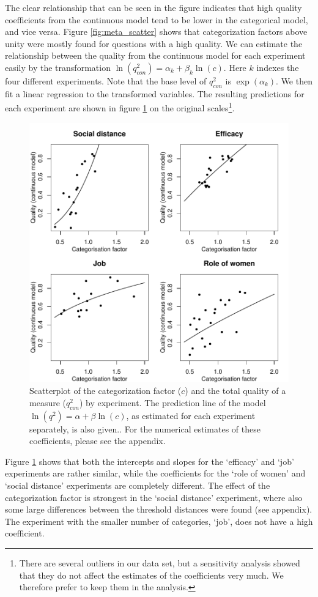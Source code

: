 \documentclass[a4paper,12pt]{article}
\begin{document}
The clear relationship that can be seen in the figure indicates that high quality coefficients from the continuous model tend to be lower in the categorical model, and vice versa. Figure \ref{fig:meta_scatter} shows that categorization factors above unity were mostly found for questions with a high quality. We can estimate the relationship between the quality from the continuous model for each experiment easily by the transformation $\ln(q^2_{con}) = \alpha_k + \beta_k \ln(c)$. Here $k$ indexes the four different experiments. Note that the base level of $q^2_{con}$ is $\exp(\alpha_k)$.%
We then fit a linear regression to the transformed variables. The resulting predictions for each experiment are shown in figure \ref{fig:predict} on the original scales\footnote{There are several outliers in our data set, but a sensitivity analysis showed that they do not affect the estimates of the coefficients very much. We therefore prefer to keep them in the analysis.}.

\begin{figure}[bth] \centering \includegraphics[width=.7\textwidth]{i/predict_q2.pdf} \caption{Scatterplot of the categorization factor ($c$) and the total quality of a measure ($q^2_{con}$) by experiment. The prediction line of the model $\ln(q^2) = \alpha + \beta \ln(c)$, as estimated for each experiment separately, is also given.\label{fig:predict}. For the numerical estimates of these coefficients, please see the appendix.} \end{figure}

Figure \ref{fig:predict} shows that both the intercepts and slopes for the `efficacy' and `job' experiments are rather similar, while the coefficients for the `role of women' and `social distance' experiments are completely different. The effect of the categorization factor is strongest in the `social distance' experiment, where also some large differences between the threshold distances were found (see appendix). The experiment with the smaller number of categories, `job', does not have a high coefficient.
\end{document}
